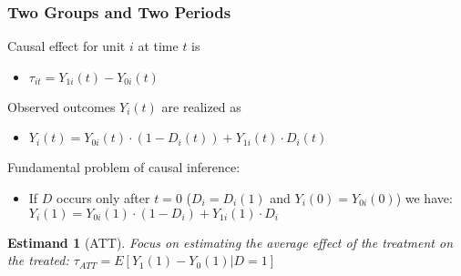 \documentclass{beamer}
\numberwithin{equation}{section}
\newtheorem{estm}{Estimand}
\begin{document}
\begin{frame}
  \frametitle{Two Groups and Two Periods}
\begin{Definition}
Causal effect for unit $i$ at time $t$ is
\begin{itemize}
\item $\tau_{it}=Y_{1i}(t)-Y_{0i}(t)$
\end{itemize}\medskip
Observed outcomes $Y_i(t)$ are realized as
\begin{itemize}
\item $Y_i(t)=Y_{0i}(t)\cdot (1-D_i(t))+Y_{1i}(t)\cdot D_i(t)$
\end{itemize}\medskip
Fundamental problem of causal inference:
\begin{itemize}
  \item  If $D$ occurs only after $t=0$ ($D_i=D_i(1)$ and $Y_i(0)=Y_{0i}(0)$) we have: $Y_i(1)=Y_{0i}(1)\cdot (1-D_i)+Y_{1i}(1)\cdot
D_i$
\end{itemize}
\end{Definition}
\begin{estm}[ATT]
Focus on estimating the average
effect of the treatment on the treated: $\tau_{ATT}=E[Y_{1}(1)-Y_{0}(1)|D=1]$
\end{estm}
\end{frame}
\end{document}
